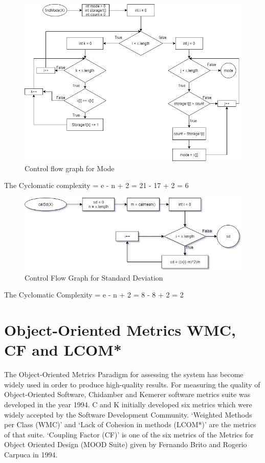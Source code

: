 \documentclass[a4paper, 11pt]{article}
\begin{document}
\begin{figure}[H]
		\begin{center}
		\includegraphics[width=\columnwidth]{mode_controlFlow.png}
		\caption{Control flow graph for Mode}
		\label{fig:figure}
		\end{center}
	\end{figure}
The Cyclomatic complexity = e - n + 2 = 21 - 17 + 2 = 6\\
\begin{figure}[H]
		\begin{center}
		\includegraphics[width=\columnwidth]{sd_controlFlow.png}
		\caption{Control Flow Graph for Standard Deviation}
		\label{fig:figure}
		\end{center}
	\end{figure}

The Cyclomatic Complexity = e - n + 2 = 8 - 8 + 2  = 2\\



\section{Object-Oriented Metrics WMC, CF and LCOM*}
The Object-Oriented Metrics Paradigm for assessing the system has become widely used in order to produce high-quality results. For measuring the quality of Object-Oriented Software, Chidamber and Kemerer software metrics suite was developed in the year 1994. C and K initially developed  six metrics which were widely accepted by the Software Development Community. ‘Weighted Methods per Class (WMC)’ and ‘Lack of Cohesion in methods (LCOM*)’ are the metrics of that suite. ‘Coupling Factor (CF)’ is one of the six metrics of the Metrics for Object Oriented Design (MOOD Suite) given by Fernando Brito and Rogerio Carpuca in 1994.\cite{9}\\
\end{document}
